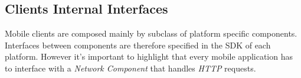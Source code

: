 \subsection{Clients Internal Interfaces}
\label{sub:back_end_interfaces}
Mobile clients are composed mainly by subclass of platform specific components.\\
Interfaces between components are therefore specified in the SDK of each platform.
However it's important to highlight that every mobile application has to interface with a \emph{Network Component} that handles \emph{HTTP} requests.\\







